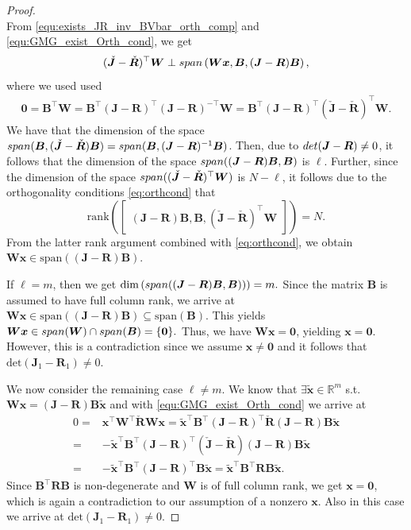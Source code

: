 \documentclass[10pt,a4paper]{amsart}
\newcommand{\FOMsize}{N}
\newcommand{\Jcheck}{\check{\bmJ}}
\newcommand{\R}{\mathbb{R}}
\newcommand{\Rcheck}{\check{\bmR}}
\newcommand{\bmB}{\bm{B}}
\newcommand{\bmJ}{\bm{J}}
\newcommand{\bmR}{\bm{R}}
\newcommand{\bmW}{\bm{W}}
\newcommand{\bzero}{\mathbf{0}}
\newcommand{\portsize}{m}
\newcommand{\stateapprox}{\tilde{\bm x}}
\newcommand{\statex}{{\bm x}}
\begin{document}
\begin{proof}
\begin{equation}
			\end{equation}
			From \eqref{equ:exists_JR_inv_BVbar_orth_comp} and \eqref{equ:GMG_exist_Orth_cond}, we get 
			\begin{align} \label{eq:orthcond}(\Jcheck-\Rcheck)^{\top}\bmW\perp \textnormal{span}\left( \bmW\statex, \bmB, (\bmJ-\bmR) \bmB\right), \end{align}
			where we used used
			\begin{align*}
				\bm{0} = \bmB^\top\bmW = \bmB^\top (\bmJ-\bmR)^\top (\bmJ-\bmR)^{-\top}  \bmW = \bmB^\top (\bmJ-\bmR)^\top (\Jcheck-\Rcheck)^{\top}  \bmW.
			\end{align*}
			We have that the dimension of the space $\textnormal{span}(\bmB,(\Jcheck-\Rcheck)\bmB) = \textnormal{span}(\bmB,(\bmJ-\bmR)^{-1}\bmB)$. Then, due to $\textnormal{det}(\bmJ-\bmR)\neq 0$, it follows that the dimension of the space $\textnormal{span}((\bmJ-\bmR)\bmB, \bmB)$ is $\ell$. Further, since the dimension of the space $\textnormal{span} ((\Jcheck-\Rcheck)^{\top}\bmW)$ is $\FOMsize-\ell$, it follows due to the orthogonality conditions \eqref{eq:orthcond} that 				
			$$
				\mathrm{rank}\left(
				\begin{bmatrix}
					(\bmJ-\bmR)\bmB, \bmB, (\Jcheck-\Rcheck)^{\top}\bmW
				\end{bmatrix}
				\right) =\FOMsize.$$
				From the latter rank argument combined with \eqref{eq:orthcond}, we obtain $\bmW\statex\in\mathrm{span}\left((\bmJ-\bmR)\bmB\right)$. 
			
			If $\ell=\portsize$, then
			  we get $
			\mathrm{dim}\left(\textnormal{span}
				((\bmJ-\bmR)\bmB, \bmB))\right)
			=\portsize.
			$ 
			Since the matrix $\bmB$ is assumed to have full column rank, we arrive at $\bmW\statex\in \mathrm{span}
			\left((\bmJ-\bmR)\bmB\right)\subseteq
			\mathrm{span}(\bmB).
			$
			This yields $\bmW\statex\in \textnormal{span}(\bmW)\cap \textnormal{span}( \bmB)= \{ \bm{0} \}.$
			Thus, we have $\bmW\statex=\bm{0}$, yielding $\statex=\bm{0}$. However, this is a contradiction since we assume $\statex\neq\bm{0}$ and it follows that $\mathrm{det}(\bmJ_1-\bmR_1)\neq0. $
			
		    We now consider the remaining case $\ell\neq\portsize$.
		    We know that  $\exists\stateapprox\in\R^{\portsize}$ s.t. $\bmW\statex=(\bmJ-\bmR)\bmB\stateapprox$ and with \eqref{equ:GMG_exist_Orth_cond} we arrive at
			\begin{align*}
				0 =&\statex^{\top}\bmW^{\top}\Rcheck\bmW\statex
				=\stateapprox^{\top}\bmB^{\top}(\bmJ-\bmR)^{\top}
				\Rcheck
				(\bmJ-\bmR)\bmB\stateapprox\\
				=&
				-\stateapprox^{\top}\bmB^{\top}(\bmJ-\bmR)^{\top}
				(\Jcheck-\Rcheck)
				(\bmJ-\bmR)\bmB\stateapprox\\
				=&
				-\stateapprox^{\top}\bmB^{\top}(\bmJ-\bmR)^{\top}
				\bmB\stateapprox
				=
				\stateapprox^{\top}\bmB^{\top}\bmR
				\bmB\stateapprox.
			\end{align*}
			Since $\bmB^{\top}\bmR\bmB$ is non-degenerate and $\bmW$ is of full column rank, we get $\statex= \bzero$, which is again a contradiction to our assumption of a nonzero $\statex$. Also in this case we arrive at $\mathrm{det}(\bmJ_1-\bmR_1)\neq0.$
			

\end{proof}
\end{document}
